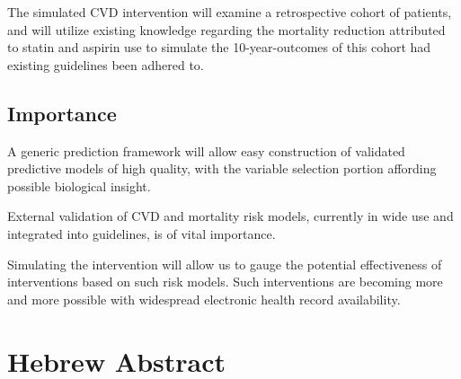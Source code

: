 \documentclass[a4paper,12pt]{article}
\begin{document}
		The simulated CVD intervention will examine a retrospective cohort of patients, and will utilize existing knowledge regarding the mortality reduction attributed to statin and aspirin use to simulate the 10-year-outcomes of this cohort had existing guidelines been adhered to.
		
		\subsection{Importance}
		A generic prediction framework will allow easy construction of validated predictive models of high quality, with the variable selection portion affording possible biological insight.
		
		External validation of CVD and mortality risk models, currently in wide use and integrated into guidelines, is of vital importance\cite{Moons2012}.
		
		Simulating  the intervention will allow us to gauge the potential effectiveness of interventions based on such risk models. Such interventions are becoming more and more possible with widespread electronic health record availability.
		
	\section{Hebrew Abstract}
	
\end{document}
